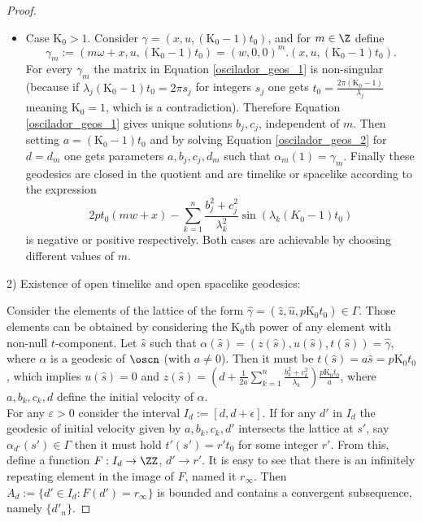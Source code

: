 \documentclass[11pt]{amsart}
\theoremstyle{plain}
\theoremstyle{definition}
\theoremstyle{remark}
\begin{document}
\begin{proof}
\begin{itemize}
				\item Case $\mathrm{K_0}>1$. Consider $\gamma=(x,u,(\mathrm{K_0}-1)t_0)$, and for $m\in \Z$ define 
				$$\gamma_m := {(m \omega + x, u, (\mathrm{K_0}-1) t_0)} = (w,0,0)^m.(x,u,(\mathrm{K_0}-1) t_0).$$
				 For every $\gamma_m$ the matrix in Equation \eqref{oscilador_geos_1} is non-singular (because if $\lambda_j (\mathrm{K_0}-1) t_0 = 2 \pi s_j$ for integers $s_j$ one gets $t_0 = \frac{2 \pi (\mathrm{K_0}-1)}{\lambda_j}$ meaning $\mathrm{K_0}=1$, which is a contradiction). Therefore Equation \eqref{oscilador_geos_1} gives unique solutions $b_j,c_j$, independent of $m$. Then setting $a=(\mathrm{K_0}-1) t_0$ and by solving Equation \eqref{oscilador_geos_2} for $d=d_m$ one gets parameters $a,b_j,c_j,d_m$ such that $\alpha_m(1) = \gamma_m$.     
				Finally these geodesics are closed in the quotient and are timelike or spacelike according to the expression  $$ 2 p t_0 (mw+x) - \sum_{k=1}^{n} \frac{b_j^2 + c_j^2}{\lambda_k^2}\sin(\lambda_k (K_0-1) t_0) $$ is negative or positive respectively. Both cases are achievable by choosing different values of $m$.
				
			\end{itemize}
		
		
			
			2) Existence of open timelike and open spacelike geodesics:
			
		Consider the elements of the lattice of the form  $\hat{\gamma}=(\hat{z},\hat{u}, p \mathrm{K_0} t_0) \in \Gamma$. Those elements can be obtained by considering the $\mathrm{K_0}$th power of  any element with non-null $t$-component. Let $\hat{s}$ such that $\alpha(\hat{s})=(z(\hat{s}),u(\hat{s}),t(\hat{s})) = \hat{\gamma}$, where $\alpha$ is a geodesic of $\oscn$ (with $a \neq 0$). Then it must be $t(\hat{s}) = a \hat{s} = p \mathrm{K_0} t_0$, which implies $u(\hat{s})=0$ and $z(\hat{s}) = (d + \frac{1}{2 a} \sum^n_{k=1} \frac{b_k^2+ c_k^2}{\lambda_k}) \frac{p \mathrm{K_0}t_0}{a}$, where $a, b_k, c_k, d$ define the initial velocity of $\alpha$. \\
			
			For any $\varepsilon >0$ consider the interval  $I_d := [d, d+ \epsilon]$. If for any $d'$ in $I_d$ the geodesic of initial velocity given by $a, b_k,c_k, d'$  intersects the lattice at $s'$, say $\alpha_{d'}(s') \in \Gamma$ then it must hold $t'(s') = r' t_0$ for some integer $r'$. From this, define a function $F: I_d \to \ZZ$, $d'\to r'$. It is easy to see that there is an infinitely repeating element in the image of $F$, named it $r_{\infty}$. Then $A_d:= \{ d' \in I_d : F(d')= r_{\infty} \}$ is bounded and contains a convergent subsequence, namely $\{d'_n\}$.
			

\end{proof}
\end{document}
